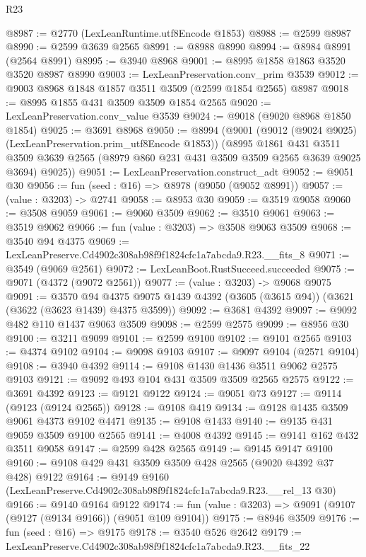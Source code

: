 \begin{lexlean}{R23}
\begin{coremodule}
@8987 := @2770 (LexLeanRuntime.utf8Encode @1853)
@8988 := @2599 @8987
@8990 := @2599 @3639 @2565
@8991 := @8988 @8990
@8994 := @8984 @8991 (@2564 @8991)
@8995 := @3940 @8968
@9001 := @8995 @1858 @1863 @3520 @3520 @8987 @8990
@9003 := LexLeanPreservation.conv_prim @3539
@9012 := @9003 @8968 @1848 @1857 @3511 @3509 (@2599 @1854 @2565) @8987
@9018 := @8995 @1855 @431 @3509 @3509 @1854 @2565
@9020 := LexLeanPreservation.conv_value @3539
@9024 := @9018 (@9020 @8968 @1850 @1854)
@9025 := @3691 @8968
@9050 := @8994
    (@9001
      (@9012 (@9024 @9025) (LexLeanPreservation.prim_utf8Encode @1853))
      (@8995
        @1861
        @431
        @3511
        @3509
        @3639
        @2565
        (@8979 @860 @231 @431 @3509 @3509 @2565 @3639 @9025 @3694)
        @9025))
@9051 := LexLeanPreservation.construct_adt
@9052 := @9051 @30
@9056 := fun (seed : @16) => @8978 (@9050 (@9052 @8991))
@9057 := (value : @3203) -> @2741
@9058 := @8953 @30
@9059 := @3519 @9058
@9060 := @3508 @9059
@9061 := @9060 @3509
@9062 := @3510 @9061
@9063 := @3519 @9062
@9066 := fun (value : @3203) => @3508 @9063 @3509
@9068 := @3540 @94 @4375
@9069 := LexLeanPreserve.Cd4902c308ab98f9f1824cfc1a7abcda9.R23.__fits_8
@9071 := @3549 (@9069 @2561)
@9072 := LexLeanBoot.RustSucceed.succeeded
@9075 := @9071 (@4372 (@9072 @2561))
@9077 := (value : @3203) -> @9068 @9075
@9091 := @3570
    @94
    @4375
    @9075
    @1439
    @4392
    (@3605 (@3615 @94))
    (@3621 (@3622 (@3623 @1439) @4375 @3599))
@9092 := @3681 @4392
@9097 := @9092 @482 @110 @1437 @9063 @3509
@9098 := @2599 @2575
@9099 := @8956 @30
@9100 := @3211 @9099
@9101 := @2599 @9100
@9102 := @9101 @2565
@9103 := @4374 @9102
@9104 := @9098 @9103
@9107 := @9097 @9104 (@2571 @9104)
@9108 := @3940 @4392
@9114 := @9108 @1430 @1436 @3511 @9062 @2575 @9103
@9121 := @9092 @493 @104 @431 @3509 @3509 @2565 @2575
@9122 := @3691 @4392
@9123 := @9121 @9122
@9124 := @9051 @73
@9127 := @9114 (@9123 (@9124 @2565))
@9128 := @9108 @419
@9134 := @9128 @1435 @3509 @9061 @4373 @9102 @4471
@9135 := @9108 @1433
@9140 := @9135 @431 @9059 @3509 @9100 @2565
@9141 := @4008 @4392
@9145 := @9141 @162 @432 @3511 @9058
@9147 := @2599 @428 @2565
@9149 := @9145 @9147 @9100
@9160 := @9108 @429 @431 @3509 @3509 @428 @2565 (@9020 @4392 @37 @428) @9122
@9164 := @9149 @9160 (LexLeanPreserve.Cd4902c308ab98f9f1824cfc1a7abcda9.R23.__rel_13 @30)
@9166 := @9140 @9164 @9122
@9174 := fun (value : @3203) => @9091 (@9107 (@9127 (@9134 @9166)) (@9051 @109 @9104))
@9175 := @8946 @3509
@9176 := fun (seed : @16) => @9175
@9178 := @3540 @526 @2642
@9179 := LexLeanPreserve.Cd4902c308ab98f9f1824cfc1a7abcda9.R23.__fits_22

\end{coremodule}
\end{lexlean}
